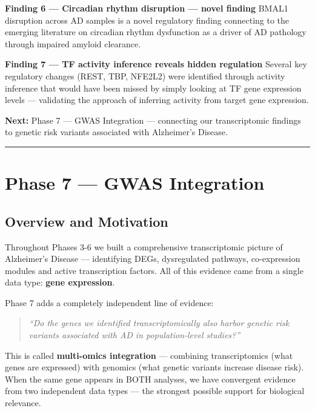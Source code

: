 \documentclass[
]{article}
\begin{document}
\textbf{Finding 6 --- Circadian rhythm disruption --- novel finding}
BMAL1 disruption across AD samples is a novel regulatory finding
connecting to the emerging literature on circadian rhythm dysfunction as
a driver of AD pathology through impaired amyloid clearance.

\textbf{Finding 7 --- TF activity inference reveals hidden regulation}
Several key regulatory changes (REST, TBP, NFE2L2) were identified
through activity inference that would have been missed by simply looking
at TF gene expression levels --- validating the approach of inferring
activity from target gene expression.

\textbf{Next:} Phase 7 --- GWAS Integration --- connecting our
transcriptomic findings to genetic risk variants associated with
Alzheimer's Disease.

\begin{center}\rule{0.5\linewidth}{0.5pt}\end{center}

\section{Phase 7 --- GWAS Integration}\label{phase-7-gwas-integration}

\subsection{Overview and Motivation}\label{overview-and-motivation-2}

Throughout Phases 3-6 we built a comprehensive transcriptomic picture of
Alzheimer's Disease --- identifying DEGs, dysregulated pathways,
co-expression modules and active transcription factors. All of this
evidence came from a single data type: \textbf{gene expression}.

Phase 7 adds a completely independent line of evidence:

\begin{quote}
\emph{``Do the genes we identified transcriptomically also harbor
genetic risk variants associated with AD in population-level studies?''}
\end{quote}

This is called \textbf{multi-omics integration} --- combining
transcriptomics (what genes are expressed) with genomics (what genetic
variants increase disease risk). When the same gene appears in BOTH
analyses, we have convergent evidence from two independent data types
--- the strongest possible support for biological relevance.
\end{document}
